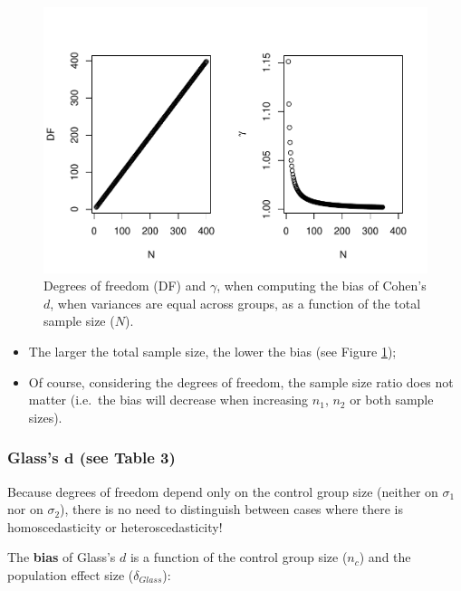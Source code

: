 \documentclass[
  english,
  man,mask]{apa6}
\begin{document}
\begin{figure}
\centering
\includegraphics{Theoretical-Bias-of-all-estimators-as-a-function-of-population-parameters_files/figure-latex/biascohendNsize2-1.pdf}
\caption{\label{fig:biascohendNsize2}Degrees of freedom (DF) and \(\gamma\), when computing the bias of Cohen's \(d\), when variances are equal across groups, as a function of the total sample size (\(N\)).}
\end{figure}

\begin{itemize}
\item
  The larger the total sample size, the lower the bias (see Figure \ref{fig:biascohendNsize2});
\item
  Of course, considering the degrees of freedom, the sample size ratio does not matter (i.e.~the bias will decrease when increasing \(n_1\), \(n_2\) or both sample sizes).
\end{itemize}

\hypertarget{glasss-bmd-see-table-3}{%
\subsubsection{\texorpdfstring{Glass's \(\bm{d}\) (see Table 3)}{Glass's \textbackslash bm\{d\} (see Table 3)}}\label{glasss-bmd-see-table-3}}

Because degrees of freedom depend only on the control group size (neither on \(\sigma_1\) nor on \(\sigma_2\)), there is no need to distinguish between cases where there is homoscedasticity or heteroscedasticity!

The \textbf{bias} of Glass's \(d\) is a function of the control group size (\(n_c\)) and the population effect size (\(\delta_{Glass}\)):
\end{document}

